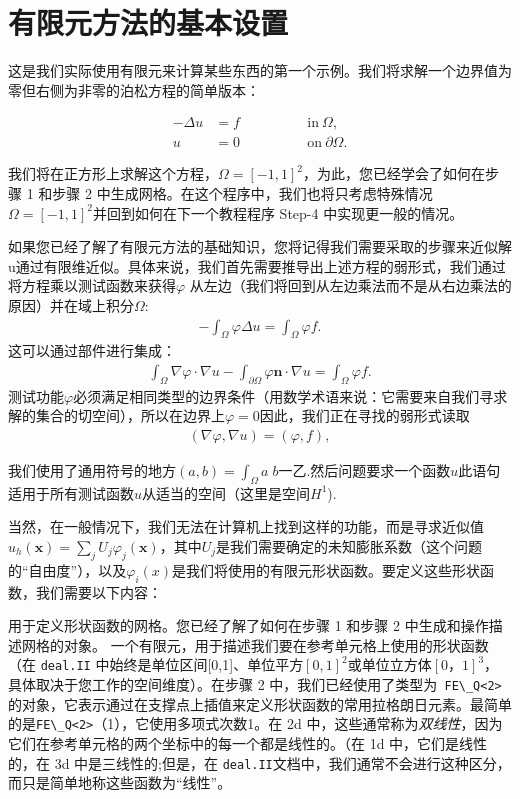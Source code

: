 \documentclass[12pt, a4paper]{article}
\numberwithin{equation}{section} %
\begin{document}
\newpage
\section{有限元方法的基本设置}
这是我们实际使用有限元来计算某些东西的第一个示例。我们将求解一个边界值为零但右侧为非零的泊松方程的简单版本：

\begin{align*} 
	-\Delta u &= f 	\qquad 	\qquad & \text{in}\ \Omega,\\ 
	u &= 0 		\qquad	\qquad & \text{on}\ \partial\Omega. 
\end{align*}

我们将在正方形上求解这个方程，$\Omega=[-1,1]^2$，为此，您已经学会了如何在步骤 1 和步骤 2 中生成网格。在这个程序中，我们也将只考虑特殊情况$\Omega=[-1,1]^2$并回到如何在下一个教程程序 Step-4 中实现更一般的情况。

如果您已经了解了有限元方法的基础知识，您将记得我们需要采取的步骤来近似解u通过有限维近似。具体来说，我们首先需要推导出上述方程的弱形式，我们通过将方程乘以测试函数来获得$\varphi$ 从左边（我们将回到从左边乘法而不是从右边乘法的原因）并在域上积分$\Omega$:
\begin{align*} -\int_\Omega \varphi \Delta u = \int_\Omega \varphi f. \end{align*}
这可以通过部件进行集成：
\begin{align*} \int_\Omega \nabla\varphi \cdot \nabla u - \int_{\partial\Omega} \varphi \mathbf{n}\cdot \nabla u = \int_\Omega \varphi f. \end{align*}
测试功能$\varphi$必须满足相同类型的边界条件（用数学术语来说：它需要来自我们寻求解的集合的切空间），所以在边界上$\varphi = 0$因此，我们正在寻找的弱形式读取
\begin{align*} (\nabla\varphi, \nabla u) = (\varphi, f), \end{align*}

我们使用了通用符号的地方$(a,b)=\int_\Omega a\; b$一乙.然后问题要求一个函数$u$此语句适用于所有测试函数$u$从适当的空间（这里是空间$H^1$).

当然，在一般情况下，我们无法在计算机上找到这样的功能，而是寻求近似值$u_h(\mathbf x)=\sum_j U_j \varphi_j(\mathbf x)$，其中$U_j$是我们需要确定的未知膨胀系数（这个问题的“自由度”），以及$\varphi_i(x)$是我们将使用的有限元形状函数。要定义这些形状函数，我们需要以下内容：

用于定义形状函数的网格。您已经了解了如何在步骤 1 和步骤 2 中生成和操作描述网格的对象。
一个有限元，用于描述我们要在参考单元格上使用的形状函数（在 \verb|deal.II| 中始终是单位区间[0,1]、单位平方$[0,1]^2$或单位立方体$[0，1]^3$，具体取决于您工作的空间维度）。在步骤 2 中，我们已经使用了类型为\verb| FE\_Q<2>| 的对象，它表示通过在支撑点上插值来定义形状函数的常用拉格朗日元素。最简单的是\verb|FE\_Q<2>|（1），它使用多项式次数1。在 2d 中，这些通常称为\textit{双线性}，因为它们在参考单元格的两个坐标中的每一个都是线性的。（在 1d 中，它们是线性的，在 3d 中是三线性的;但是，在 \verb|deal.II|文档中，我们通常不会进行这种区分，而只是简单地称这些函数为“线性”。
\end{document}

